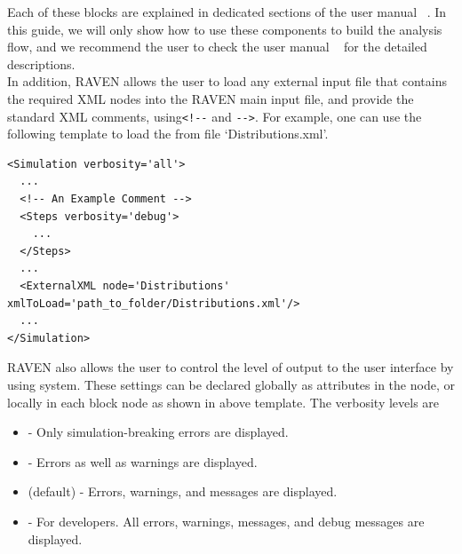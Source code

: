Each of these blocks are explained in dedicated sections of the user manual ~\cite{RAVENuserManual}. In this guide,
we will only show how to use these components to build the analysis flow, and we recommend the user to check the user
manual ~\cite{RAVENuserManual} for the detailed descriptions.
%
\\In addition, RAVEN allows the user to load any external input file that contains the required XML nodes into the RAVEN main input
file, and provide the standard XML comments, using\verb|<!--| and \verb|-->|. For example, one can use the following template to load
the  from file `Distributions.xml'.
%
\begin{lstlisting}[style=XML,morekeywords={node,xmlToLoad}]
<Simulation verbosity='all'>
  ...
  <!-- An Example Comment -->
  <Steps verbosity='debug'>
    ...
  </Steps>
  ...
  <ExternalXML node='Distributions' xmlToLoad='path_to_folder/Distributions.xml'/>
  ...
</Simulation>
\end{lstlisting}
%
RAVEN also allows the user to control the level of output to the user interface by using  system. These settings can be
declared globally as attributes in the  node, or locally in each block node as shown in above template.
The verbosity levels are
\begin{itemize}
\item {} - Only simulation-breaking errors are displayed.
\item {} - Errors as well as warnings are displayed.
\item {} (default) - Errors, warnings, and messages are displayed.
\item {} - For developers. All errors, warnings, messages, and debug messages are displayed.
\end{itemize}
%
